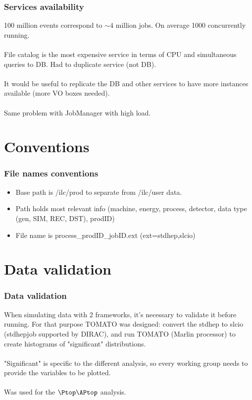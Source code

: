 \documentclass{beamer}
\begin{document}
\begin{frame}
\frametitle{Services availability}
100 million events correspond to $\sim 4$ million jobs. On average 1000 concurrently running.\\
~\\
File catalog is the most expensive service in terms of CPU and simultaneous queries to DB. Had to duplicate service (not DB). ~\\
~\\
It would be useful to replicate the DB and other services to have more instances available (more VO boxes needed).~\\
~\\
Same problem with JobManager with high load.
\end{frame}

\section{Conventions}
\begin{frame}
\frametitle{File names conventions}
\begin{itemize}
\item Base path is /ilc/prod to separate from /ilc/user data. 
\item Path holds most relevant info (machine, energy, process, detector, data type (gen, SIM, REC, DST), prodID)
\item File name is process\_prodID\_jobID.ext (ext=stdhep,slcio)
\end{itemize} 
 \end{frame}
\section{Data validation}
\begin{frame}
\frametitle{Data validation}
When simulating data with 2 frameworks, it's necessary to validate it before running. For that purpose \alert{TOMATO} was designed: convert the stdhep to slcio (stdhepjob supported by DIRAC), and run TOMATO (Marlin processor) to create histograms of "significant" distributions.  \\
~\\
"Significant" is specific to the different analysis, so every working group needs to provide the variables to be plotted.\\
~\\
Was used for the $\Ptop\APtop$ analysis.
\end{frame}
\end{document}
